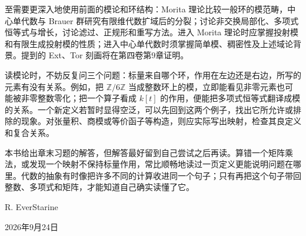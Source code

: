 \ProseParagraphBreak
{}至需要更深入地使用前面的模论和环结构：Morita 理论比较一般环的模范畴，中心单代数与 Brauer 群研究有限维代数扩域后的分裂；讨论非交换局部化、多项式恒等式与增长，讨论滤过、正规形和重写方法。进入 Morita 理论时应掌握投射模和有限生成投射模的性质；进入中心单代数时须掌握简单模、稠密性及上述域论背景。提到的 Ext、Tor 刻画将在第四卷第9章证明。

\ProseParagraphBreak
读模论时，不妨反复问三个问题：标量来自哪个环，作用在左边还是右边，所写的元素有没有关系。例如，把 \(\mathbb Z/6\mathbb Z\) 当成整数环上的模，立即能看见非零元素也可能被非零整数零化；把一个算子看成 \(k[t]\) 的作用，便能把多项式恒等式翻译成模的关系。一个新定义若暂时显得空泛，可以先回到这两个例子，找出它所允许或排除的现象。对张量积、商模或等价函子等构造，则应实际写出映射，检查其良定义和复合关系。

\ProseParagraphBreak
本书给出章末习题的解答，但解答最好留到自己尝试之后再读。算错一个矩阵乘法，或发现一个映射不保持标量作用，常比顺畅地读过一页定义更能说明问题在哪里。代数的抽象有时像把许多不同的计算收进同一个句子；只有再把这个句子带回整数、多项式和矩阵，才能知道自己确实读懂了它。

\bigskip
\begin{flushright}
	R. EverStarine

	2026年9月24日
\end{flushright}
